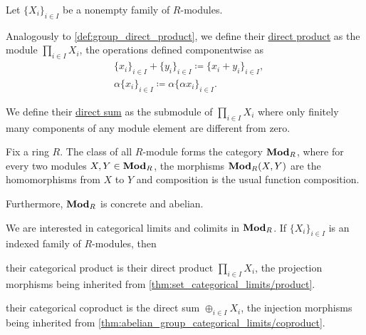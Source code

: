 \begin{definition}\label{def:module_direct_product}
  Let $\{ X_i \}_{i \in I}$ be a nonempty family of $R$-modules.

  Analogously to \cref{def:group_direct_product}, we define their \uline{direct product} as the module $\prod_{i \in I} X_i$, the operations defined componentwise as
  \begin{align*}
    &\{ x_i \}_{i \in I} + \{ y_i \}_{i \in I}
    \coloneqq
    \{ x_i + y_i \}_{i \in I}, \\
    &\alpha \{ x_i \}_{i \in I}
    \coloneqq
    \alpha \{ \alpha x_i \}_{i \in I}.
  \end{align*}

  We define their \uline{direct sum} as the submodule of $\prod_{i \in I} X_i$ where only finitely many components of any module element are different from zero.
\end{definition}

\begin{definition}\label{def:category_of_modules}
  Fix a ring $R$. The class of all $R$-module forms the category $\operatorname{\mathbf{Mod}}_R$, where for every two modules $X, Y \in \operatorname{\mathbf{Mod}}_R$, the morphisms $\operatorname{\mathbf{Mod}}_R(X, Y)$ are the homomorphisms from $X$ to $Y$ and composition is the usual function composition.

  Furthermore, $\operatorname{\mathbf{Mod}}_R$ is concrete and abelian.
\end{definition}

\begin{proposition}\label{thm:module_categorical_limits}
  We are interested in categorical limits and colimits in $\operatorname{\mathbf{Mod}}_R$. If $\{ X_i \}_{i \in I}$ is an indexed family of $R$-modules, then
  \begin{defenum}
    \item\label{thm:module_categorical_limits/product} their categorical product is their direct product $\prod_{i \in I} X_i$, the projection morphisms being inherited from \cref{thm:set_categorical_limits/product}.

    \item\label{thm:module_categorical_limits/coproduct} their categorical coproduct is the direct sum $\oplus_{i \in I} X_i$, the injection morphisms being inherited from \cref{thm:abelian_group_categorical_limits/coproduct}.
  \end{defenum}
\end{proposition}

